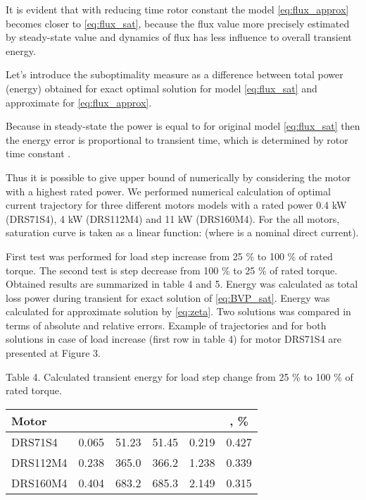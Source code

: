 \documentclass[journal]{IEEEtran}
\begin{document}
It is evident that with reducing time rotor constant  the model \eqref{eq:flux_approx} becomes closer to \eqref{eq:flux_sat}, because the flux value more precisely estimated by steady-state value  and dynamics of flux has less influence to overall transient energy. 

Let's introduce the suboptimality measure as a difference between total power (energy)  obtained for exact optimal solution  for model \eqref{eq:flux_sat} and approximate  for \eqref{eq:flux_approx}. 



Because in steady-state the power  is equal to  for original model \eqref{eq:flux_sat} then the energy error is proportional to transient time, which is determined by rotor time constant .

Thus it is possible to give upper bound of  numerically by considering the motor with a highest rated power. We performed numerical calculation of optimal current trajectory for three different motors models with a rated power 0.4 kW (DRS71S4), 4 kW (DRS112M4) and 11 kW (DRS160M4). 
For the all motors, saturation curve is taken as a linear function:  (where  is a nominal direct current).

First test was performed for load step increase from 25 \% to 100 \% of rated torque. The second test is step decrease from 100 \% to 25 \% of rated torque. Obtained results are summarized in table 4 and 5. Energy  was calculated as total loss power during transient for exact solution  of \eqref{eq:BVP_sat}. Energy  was calculated for approximate solution  by \eqref{eq:zeta}. Two solutions was compared in terms of absolute  and relative  errors. Example of trajectories  and  for both solutions in case of load increase (first row in table 4) for motor DRS71S4 are presented at Figure 3.

\begin{center}
Table 4.
Calculated transient energy for load step change from 25 \% to 100 \% of rated torque.

\begin{tabular}{ | l | c | c | c | c | c | }
\hline 
  Motor &  &  &  &  & , \% \\
\hline 
DRS71S4 & 0.065 &  51.23 &  51.45  &  0.219  &  0.427 \\
DRS112M4 & 0.238 & 365.0 & 366.2  &  1.238  &  0.339 \\ 
DRS160M4 & 0.404 & 683.2 & 685.3  &  2.149  &  0.315 \\
\hline 
\end{tabular}

\end{center}
\end{document}

